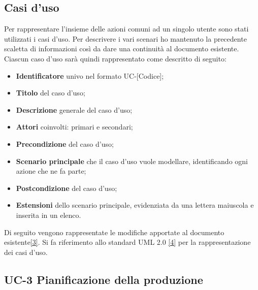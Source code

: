
\subsection{Casi d'uso}

Per rappresentare l'insieme delle azioni comuni ad un singolo utente sono stati utilizzati i casi d'uso.
Per descrivere i vari scenari ho mantenuto la precedente scaletta di informazioni così da dare una continuità al documento esistente. 
Ciascun caso d'uso sarà quindi rappresentato come descritto di seguito:
\begin{itemize}
    \item \textbf{Identificatore} univo nel formato UC-[Codice];
    \item \textbf{Titolo} del caso d'uso;
    \item \textbf{Descrizione} generale del caso d'uso;
    \item \textbf{Attori} coinvolti: primari e secondari;
    \item \textbf{Precondizione} del caso d'uso;
    \item \textbf{Scenario principale} che il caso d'uso vuole modellare, identificando ogni azione che ne fa parte;
    \item \textbf{Postcondizione} del caso d'uso;
    \item \textbf{Estensioni} dello scenario principale, evidenziata da una lettera maiuscola e inserita in un elenco.
\end{itemize}

Di seguito vengono rappresentate le modifiche apportate al documento esistente\hyperref[analisi-requisiti]{[3]}.
Si fa riferimento allo standard UML 2.0 \hyperref[uml]{[4]} per la rappresentazione dei casi d'uso.

\subsection*{UC-3 Pianificazione della produzione}

